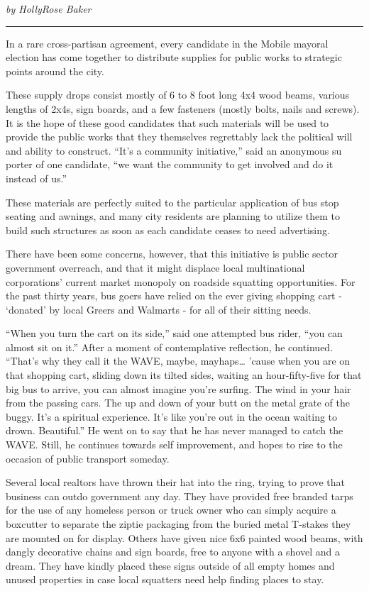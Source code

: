 \documentclass[
]{book}
\begin{document}
\emph{by HollyRose Baker}

\begin{center}\rule{0.5\linewidth}{0.5pt}\end{center}

In a rare cross-partisan agreement, every candidate in the Mobile mayoral election has come together to distribute supplies for public works to strategic points around the city.

These supply drops consist mostly of 6 to 8 foot long 4x4 wood beams, various lengths of 2x4s, sign boards, and a few fasteners (mostly bolts, nails and screws). It is the hope of these good candidates that such materials will be used to provide the public works that they themselves regrettably lack the political will and ability to construct. ``It's a community initiative,'' said an anonymous su porter of one candidate, ``we want the community to get involved and do it instead of us.''

These materials are perfectly suited to the particular application of bus stop seating and awnings, and many city residents are planning to utilize them to build such structures as soon as each candidate ceases to need advertising.

There have been some concerns, however, that this initiative is public sector government overreach, and that it might displace local multinational corporations' current market monopoly on roadside squatting opportunities. For the past thirty years, bus goers have relied on the ever giving shopping cart - `donated' by local Greers and Walmarts - for all of their sitting needs.

``When you turn the cart on its side,'' said one attempted bus rider, ``you can almost sit on it.'' After a moment of contemplative reflection, he continued. ``That's why they call it the WAVE, maybe, mayhaps\ldots{} 'cause when you are on that shopping cart, sliding down its tilted sides, waiting an hour-fifty-five for that big bus to arrive, you can almost imagine you're surfing. The wind in your hair from the passing cars. The up and down of your butt on the metal grate of the buggy. It's a spiritual experience. It's like you're out in the ocean waiting to drown. Beautiful.'' He went on to say that he has never managed to catch the WAVE. Still, he continues towards self improvement, and hopes to rise to the occasion of public transport someday.

Several local realtors have thrown their hat into the ring, trying to prove that business can outdo government any day. They have provided free branded tarps for the use of any homeless person or truck owner who can simply acquire a boxcutter to separate the ziptie packaging from the buried metal T-stakes they are mounted on for display. Others have given nice 6x6 painted wood beams, with dangly decorative chains and sign boards, free to anyone with a shovel and a dream. They have kindly placed these signs outside of all empty homes and unused properties in case local squatters need help finding places to stay.
\end{document}
